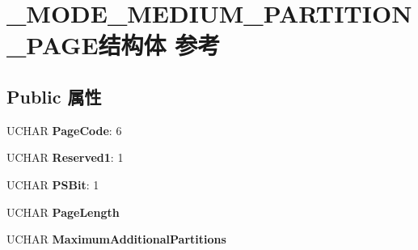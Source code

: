 \hypertarget{struct___m_o_d_e___m_e_d_i_u_m___p_a_r_t_i_t_i_o_n___p_a_g_e}{}\section{\+\_\+\+M\+O\+D\+E\+\_\+\+M\+E\+D\+I\+U\+M\+\_\+\+P\+A\+R\+T\+I\+T\+I\+O\+N\+\_\+\+P\+A\+G\+E结构体 参考}
\label{struct___m_o_d_e___m_e_d_i_u_m___p_a_r_t_i_t_i_o_n___p_a_g_e}
\subsection*{Public 属性}
\begin{DoxyCompactItemize}
\item 
\mbox{\label{struct___m_o_d_e___m_e_d_i_u_m___p_a_r_t_i_t_i_o_n___p_a_g_e_a75e179183a8f21efe361749d8033f307}} 
U\+C\+H\+AR {\bfseries Page\+Code}\+: 6
\item 
\mbox{\label{struct___m_o_d_e___m_e_d_i_u_m___p_a_r_t_i_t_i_o_n___p_a_g_e_abd385ce0b278625fd9ef293f0a4e16a3}} 
U\+C\+H\+AR {\bfseries Reserved1}\+: 1
\item 
\mbox{\label{struct___m_o_d_e___m_e_d_i_u_m___p_a_r_t_i_t_i_o_n___p_a_g_e_ab42232997ad1a1ac7ae9bf684946cb5d}} 
U\+C\+H\+AR {\bfseries P\+S\+Bit}\+: 1
\item 
\mbox{\label{struct___m_o_d_e___m_e_d_i_u_m___p_a_r_t_i_t_i_o_n___p_a_g_e_a570d244a124fc18fcba7734e6802c678}} 
U\+C\+H\+AR {\bfseries Page\+Length}
\item 
\mbox{\label{struct___m_o_d_e___m_e_d_i_u_m___p_a_r_t_i_t_i_o_n___p_a_g_e_a49b37bfc9578c7c9906a5e57bab8bf21}} 
U\+C\+H\+AR {\bfseries Maximum\+Additional\+Partitions}
\item 
\mbox{\label{struct___m_o_d_e___m_e_d_i_u_m___p_a_r_t_i_t_i_o_n___p_a_g_e_a569d0c87ed537d45ed75c9b3a73f4d4b}} 

\end{DoxyCompactItemize}

